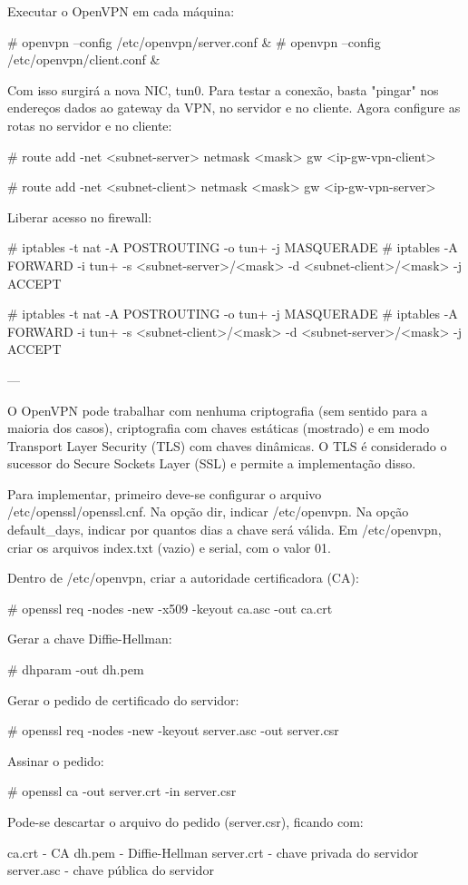 Executar o OpenVPN em cada máquina:

# openvpn --config /etc/openvpn/server.conf &
# openvpn --config /etc/openvpn/client.conf &

Com isso surgirá a nova NIC, tun0. Para testar a conexão, basta "pingar" nos endereços dados ao gateway da VPN, no servidor e no cliente. Agora configure as rotas no servidor e no cliente:

# route add -net <subnet-server> netmask <mask> gw <ip-gw-vpn-client>

# route add -net <subnet-client> netmask <mask> gw <ip-gw-vpn-server>

Liberar acesso no firewall:

# iptables -t nat -A POSTROUTING -o tun+ -j MASQUERADE
# iptables -A FORWARD -i tun+ -s <subnet-server>/<mask> -d <subnet-client>/<mask> -j ACCEPT

# iptables -t nat -A POSTROUTING -o tun+ -j MASQUERADE
# iptables -A FORWARD -i tun+ -s <subnet-client>/<mask> -d <subnet-server>/<mask> -j ACCEPT

---

O OpenVPN pode trabalhar com nenhuma criptografia (sem sentido para a maioria dos casos), criptografia com chaves estáticas (mostrado) e em modo Transport Layer Security (TLS) com chaves dinâmicas. O TLS é considerado o sucessor do Secure Sockets Layer (SSL) e permite a implementação disso.

Para implementar, primeiro deve-se configurar o arquivo /etc/openssl/openssl.cnf. Na opção dir, indicar /etc/openvpn. Na opção default_days, indicar por quantos dias a chave será válida. Em /etc/openvpn, criar os arquivos index.txt (vazio) e serial, com o valor 01.

Dentro de /etc/openvpn, criar a autoridade certificadora (CA):

# openssl req -nodes -new -x509 -keyout ca.asc -out ca.crt

Gerar a chave Diffie-Hellman:

# dhparam -out dh.pem

Gerar o pedido de certificado do servidor:

# openssl req -nodes -new -keyout server.asc -out server.csr

Assinar o pedido:

# openssl ca -out server.crt -in server.csr

Pode-se descartar o arquivo do pedido (server.csr), ficando com:

ca.crt - CA
dh.pem - Diffie-Hellman
server.crt - chave privada do servidor
server.asc - chave pública do servidor


